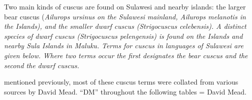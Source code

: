 Two main kinds of cuscus are found on Sulawesi
and nearby islands: the larger bear cuscus (\it{Ailurops ursinus}
on the Sulawesi mainland,
\it{Ailurops melanotis} in the  Islands),
and the smaller dwarf cuscus \it{(Strigocuscus celebensis)}.
A distinct species of dwarf cuscus \it{(Strigocuscus pelengensis)}
is found on the  Islands
and nearby Sula Islands in Maluku.
Terms for cuscus in languages of Sulawesi are given below.
Where two terms occur the first designates the bear cuscus
and the second the dwarf cuscus.

 mentioned previously, most of these cuscus terms
were collated from various sources by David Mead.
``DM'' throughout the following tables = David Mead.